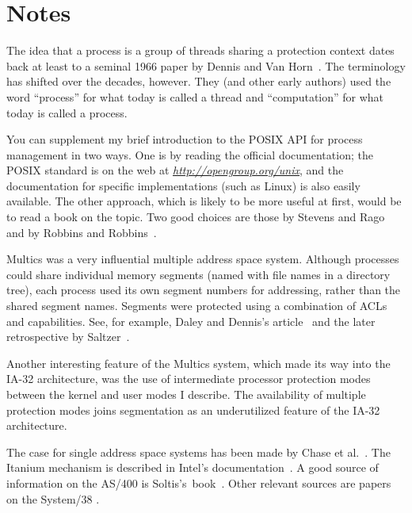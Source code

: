 \section*{Notes}
The idea that a process is a group of threads sharing a protection
context dates back at least to a seminal 1966 paper by Dennis and Van
Horn~\cite{max1090}.  The terminology has shifted over the decades,
however.  They (and other early authors) used the word ``process'' for
what today is called a thread and ``computation'' for what today is called a
process.

You can supplement my brief introduction to the POSIX API for process
management in two ways.  One is by reading the official documentation;
the POSIX standard is on the web at \textit{\url{http://opengroup.org/unix}}, and the
documentation for specific implementations (such as Linux) is also
easily available.  The other approach, which is likely to be more
useful at first, would be to read a book on the topic.  Two good choices
are those by Stevens and Rago~\cite{max1101} and by
Robbins and
Robbins~\cite{max1102}.

Multics was a very influential multiple address space system.
Although processes could share individual memory segments (named with
file names in a directory tree), each process used its own segment
numbers for addressing, rather than the shared segment names.
Segments were protected using a combination of ACLs and capabilities.
See, for example, Daley and Dennis's article~\cite{max1036} and the later retrospective
by Saltzer~\cite{max1045}.

Another interesting feature of the Multics system, which made its way
into the IA-32 architecture, was the use of intermediate processor
protection modes between the kernel and user modes I describe.  The
availability of multiple protection modes joins segmentation as an
underutilized feature of the IA-32 architecture.

The case for single address space systems has been made by
Chase et al.~\cite{max1039}.  The
Itanium mechanism is described in Intel's
documentation~\cite{max1064}.  A good source of information on the
AS/400 is Soltis's~book~\cite{max1091}.  Other relevant sources are papers on
the System/38 \cite{max1082,max1079,max1078}.


